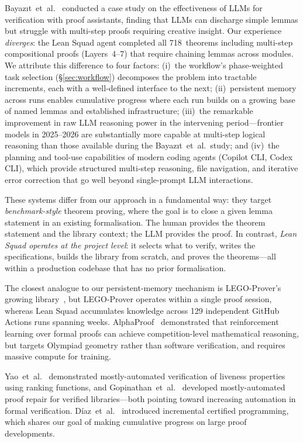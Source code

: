 \documentclass[sigconf,10pt]{acmart}
\begin{document}
Bayaz\i t~et~al.~\cite{bayazit2025llm} conducted a case study on
the effectiveness of LLMs for verification with proof assistants,
finding that LLMs can discharge simple lemmas but struggle with
multi-step proofs requiring creative insight.  Our experience
\emph{diverges}: the Lean Squad agent completed all 718~theorems
including multi-step compositional proofs (Layers~4--7) that require
chaining lemmas across modules.  We attribute this difference to
four factors: (i)~the workflow's phase-weighted task selection
(\S\ref{sec:workflow}) decomposes the problem into tractable
increments, each with a well-defined interface to the next;
(ii)~persistent memory across runs enables cumulative progress
where each run builds on a growing base of named lemmas and
established infrastructure;
(iii)~the remarkable improvement in raw LLM reasoning power in the
intervening period---frontier models in 2025--2026 are substantially
more capable at multi-step logical reasoning than those available
during the Bayaz\i t~et~al.\ study; and
(iv)~the planning and tool-use capabilities of modern coding agents
(Copilot CLI, Codex CLI), which provide structured
multi-step reasoning, file navigation, and iterative error correction
that go well beyond single-prompt LLM interactions.

These systems differ from our approach in a fundamental way:
they target \emph{benchmark-style} theorem proving, where the goal
is to close a given lemma statement in an existing formalisation.
The human provides the theorem statement and the library context;
the LLM provides the proof.  In contrast, \emph{Lean Squad operates
at the project level}: it selects what to verify, writes the
specifications, builds the library from scratch, and proves the
theorems---all within a production codebase that has no prior
formalisation.

The closest analogue to our persistent-memory mechanism is
LEGO-Prover's growing library~\cite{wang2024legoprover}, but
LEGO-Prover operates within a single proof session, whereas Lean
Squad accumulates knowledge across 129 independent GitHub Actions runs
spanning weeks.  AlphaProof~\cite{trinh2024alphaproof} demonstrated
that reinforcement learning over formal proofs can achieve
competition-level mathematical reasoning, but targets Olympiad
geometry rather than software verification, and requires massive
compute for training.

Yao~et~al.~\cite{yao2024liveness} demonstrated mostly-automated
verification of liveness properties using ranking functions, and
Gopinathan~et~al.~\cite{gopinathan2023repair} developed
mostly-automated proof repair for verified libraries---both pointing
toward increasing automation in formal verification.
D\'iaz~et~al.~\cite{diaz2025incremental} introduced incremental
certified programming, which shares our goal of making cumulative
progress on large proof developments.
\end{document}
